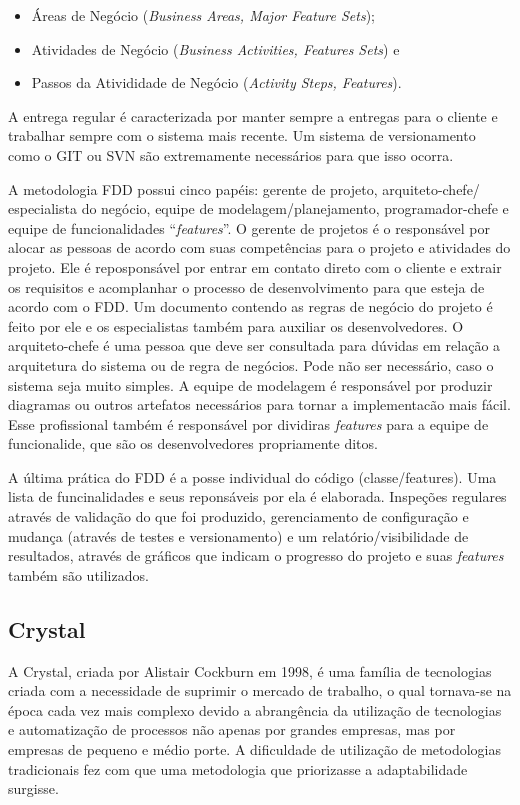 \begin{itemize}
	\item Áreas de Negócio (\textit{Business Areas, Major Feature Sets});
	\item Atividades de Negócio (\textit{Business Activities, Features Sets}) e
	\item Passos da Ativididade de Negócio (\textit{Activity Steps, Features}).
\end{itemize}

A entrega regular é caracterizada por manter sempre a entregas para o cliente e trabalhar sempre com o sistema mais recente. Um sistema de versionamento como o GIT ou SVN são extremamente necessários para que isso ocorra.

A metodologia FDD possui cinco papéis: gerente de projeto, arquiteto-chefe/ especialista do negócio, equipe de modelagem/planejamento, programador-chefe e equipe de funcionalidades ``\textit{features}''. O gerente de projetos é o responsável por alocar as pessoas de acordo com suas competências para o projeto e atividades do projeto. Ele é reposponsável por entrar em contato direto com o cliente e extrair os requisitos e acomplanhar o processo de desenvolvimento para que esteja de acordo com o FDD. Um documento contendo as regras de negócio do projeto é feito por ele e os especialistas também para auxiliar os desenvolvedores. O arquiteto-chefe é uma pessoa que deve ser consultada para dúvidas em relação a arquitetura do sistema ou de regra de negócios. Pode não ser necessário, caso o sistema seja muito simples. A equipe de modelagem é responsável por produzir diagramas ou outros artefatos necessários para tornar a implementacão mais fácil. Esse profissional também é responsável por dividiras \textit{features} para a equipe de funcionalide, que são os desenvolvedores propriamente ditos.

A última prática do FDD é a posse individual do código (classe/features). Uma lista de funcinalidades e seus reponsáveis por ela é elaborada. Inspeções regulares através de validação do que foi produzido, gerenciamento de configuração e mudança (através de testes e versionamento) e um relatório/visibilidade de resultados, através de gráficos que indicam o progresso do projeto e suas \textit{features} também são utilizados.   

\subsection{Crystal}

A Crystal, criada por Alistair Cockburn em 1998, é uma família de tecnologias criada com a necessidade de suprimir o mercado de trabalho, o qual tornava-se na época cada vez mais complexo devido a abrangência da utilização de tecnologias e automatização de processos não apenas por grandes empresas, mas por empresas de pequeno e médio porte. A dificuldade de utilização de metodologias tradicionais fez com que uma metodologia que priorizasse a adaptabilidade surgisse. \cite{pressman:11} \cite{macedo:12}

